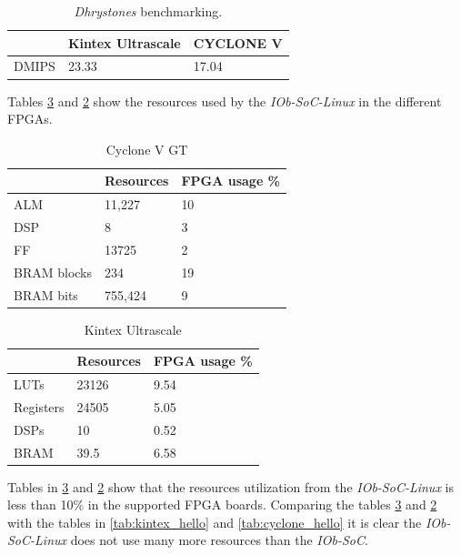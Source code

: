 \begin{table}[!ht]
    \centering
    \begin{tabular}{l|l|l|}
    \cline{2-3}
                                & \textbf{Kintex Ultrascale} & \textbf{CYCLONE V} \\ \hline
    \multicolumn{1}{|l|}{DMIPS} & 23.33                      & 17.04              \\ \hline
    \end{tabular}
    \caption{\textit{Dhrystones} benchmarking.}
    \label{tab:dhrystones}
\end{table}

Tables \ref{tab:kintex_linux} and \ref{tab:cyclone_linux} show the resources used by the \textit{IOb-SoC-Linux} in the different FPGAs.

\begin{table}[!ht]
    \centering
    \begin{tabular}{l|l|l|}
        \cline{2-3}
                                            & Resources & FPGA usage \% \\ \hline
        \multicolumn{1}{|l|}{ALM}         & 11,227    & 10                       \\ \hline
        \multicolumn{1}{|l|}{DSP}         & 8         & 3                        \\ \hline
        \multicolumn{1}{|l|}{FF}          & 13725     & 2                        \\ \hline
        \multicolumn{1}{|l|}{BRAM blocks} & 234       & 19                       \\ \hline
        \multicolumn{1}{|l|}{BRAM bits}   & 755,424   & 9                        \\ \hline
    \end{tabular}
    \caption{Cyclone V GT}
    \label{tab:cyclone_linux}
\end{table}
\begin{table}[!ht]
    \centering
    \begin{tabular}{l|l|l|}
        \cline{2-3}
                                        & Resources & FPGA usage \% \\ \hline
        \multicolumn{1}{|l|}{LUTs}      & 23126     & 9.54                     \\ \hline
        \multicolumn{1}{|l|}{Registers} & 24505     & 5.05                     \\ \hline
        \multicolumn{1}{|l|}{DSPs}      & 10        & 0.52                     \\ \hline
        \multicolumn{1}{|l|}{BRAM}      & 39.5      & 6.58                     \\ \hline
    \end{tabular}
    \caption{Kintex Ultrascale}
    \label{tab:kintex_linux}
\end{table}

Tables in \ref{tab:kintex_linux} and \ref{tab:cyclone_linux} show that the resources utilization from the \textit{IOb-SoC-Linux} is less than 10\% in the supported FPGA boards. Comparing the tables \ref{tab:kintex_linux} and \ref{tab:cyclone_linux} with the tables in \ref{tab:kintex_hello} and \ref{tab:cyclone_hello} it is clear the \textit{IOb-SoC-Linux} does not use many more resources than the \textit{IOb-SoC}.